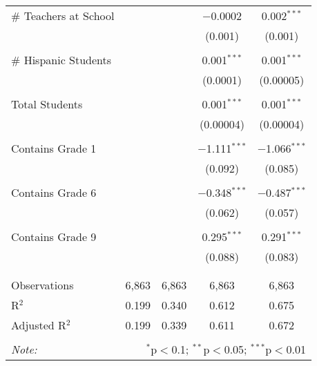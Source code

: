 \begin{table}[!htbp]
\begin{tabular}{@{\extracolsep{-2pt}}lcccc}
 \# Teachers at School &  &  & $-$0.0002 & 0.002$^{***}$ \\ 
  &  &  & (0.001) & (0.001) \\ 
  & & & & \\ 
 \# Hispanic Students &  &  & 0.001$^{***}$ & 0.001$^{***}$ \\ 
  &  &  & (0.0001) & (0.00005) \\ 
  & & & & \\ 
 Total Students &  &  & 0.001$^{***}$ & 0.001$^{***}$ \\ 
  &  &  & (0.00004) & (0.00004) \\ 
  & & & & \\ 
 Contains Grade 1 &  &  & $-$1.111$^{***}$ & $-$1.066$^{***}$ \\ 
  &  &  & (0.092) & (0.085) \\ 
  & & & & \\ 
 Contains Grade 6 &  &  & $-$0.348$^{***}$ & $-$0.487$^{***}$ \\ 
  &  &  & (0.062) & (0.057) \\ 
  & & & & \\ 
 Contains Grade 9 &  &  & 0.295$^{***}$ & 0.291$^{***}$ \\ 
  &  &  & (0.088) & (0.083) \\ 
  & & & & \\ 
\hline \\[-1.8ex] 
Observations & 6,863 & 6,863 & 6,863 & 6,863 \\ 
R$^{2}$ & 0.199 & 0.340 & 0.612 & 0.675 \\ 
Adjusted R$^{2}$ & 0.199 & 0.339 & 0.611 & 0.672 \\ 
\hline 
\hline \\[-1.8ex] 
\textit{Note:}  & \multicolumn{4}{r}{$^{*}$p$<$0.1; $^{**}$p$<$0.05; $^{***}$p$<$0.01} \\ 
\end{tabular} 
\end{table} 

